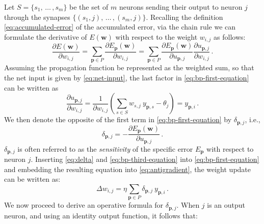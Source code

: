 \documentclass[12pt, a4paper, twoside, openright, notitlepage]{report}
\numberwithin{equation}{chapter}
\theoremstyle{theorem}
\theoremstyle{definition}
\theoremstyle{remark}
\theoremstyle{proposition}
\numberwithin{figure}{chapter}
\begin{document}
		Let $S = \big\lbrace s_1, \, \ldots \, , s_m \big\rbrace$ be the set of $m$ neurons sending their output to neuron $j$ through the synapses $\big\lbrace (s_1,j), \, \ldots \, , (s_m,j) \big\rbrace$. Recalling the definition \eqref{eq:accumulated-error} of the accumulated error, via the chain rule we can formulate the derivative of $E(\mathbf{w})$ with respect to the weight $w_{i,j}$ as follows:
		\begin{equation}
			\label{eq:bp-first-equation}
			\dfrac{\partial E(\mathbf{w})}{\partial w_{i,j}} = \sum_{\mathbf{p} \in P} \dfrac{\partial E_{\mathbf{p}}(\mathbf{w})}{\partial w_{i,j}} = \sum_{\mathbf{p} \in P} \dfrac{\partial E_{\mathbf{p}}(\mathbf{w})}{\partial u_{\mathbf{p},j}} \dfrac{\partial u_{\mathbf{p},j}}{\partial w_{i,j}} \, .
		\end{equation}
		Assuming the propagation function be represented as the weighted sum, so that the net input is given by \eqref{eq:net-input}, the last factor in \eqref{eq:bp-first-equation} can be written as
		\begin{equation}
			\label{eq:bp-third-equation}
			\dfrac{\partial u_{\mathbf{p},j}}{\partial w_{i,j}} = \dfrac{1}{\partial w_{i,j}} \left( \sum_{s \in S} w_{s,j} ~ y_{\mathbf{p},s} - \theta_j \right) = y_{\mathbf{p},i} \, .
		\end{equation}
		We then denote the opposite of the first term in \eqref{eq:bp-first-equation} by $\delta_{\mathbf{p},j}$, i.e.,
		\begin{equation}
			\label{eq:delta}
			\delta_{\mathbf{p},j} = - \dfrac{\partial E_{\mathbf{p}}(\mathbf{w})}{\partial u_{\mathbf{p},j}} \, .
		\end{equation} 
		$\delta_{\mathbf{p},j}$ is often referred to as the \emph{sensitivity} of the specific error $E_{\mathbf{p}}$ with respect to neuron $j$. Inserting \eqref{eq:delta} and \eqref{eq:bp-third-equation} into \eqref{eq:bp-first-equation} and embedding the resulting equation into \eqref{eq:antigradient}, the weight update can be written as:
		\begin{equation}
			\label{eq:bp-weight-update}
			\Delta w_{i,j} = \eta \sum_{\mathbf{p} \in P} \delta_{\mathbf{p},j} ~ y_{\mathbf{p},i} \, .
		\end{equation}
		We now proceed to derive an operative formula for $\delta_{\mathbf{p},j}$. When $j$ is an output neuron, and using an identity output function, it follows that: 
\end{document}
